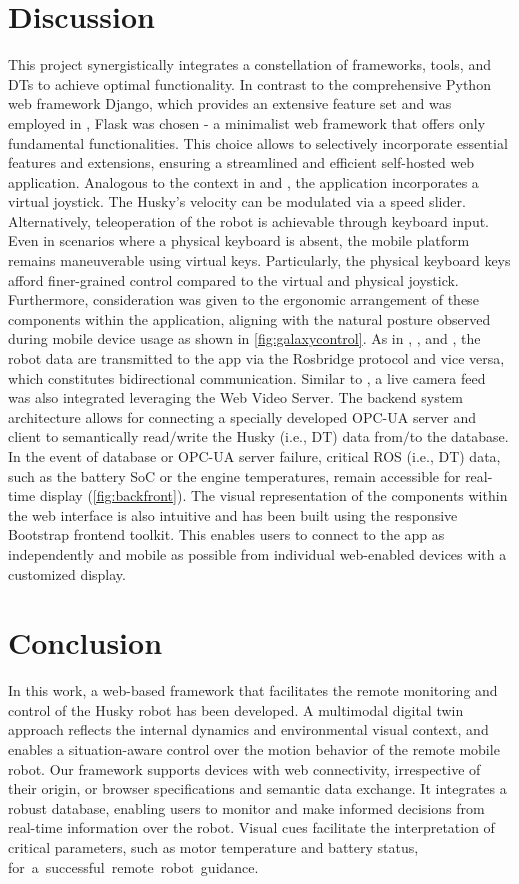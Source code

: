 \documentclass[conference]{IEEEtran}
\begin{document}
\section{Discussion}
This project synergistically integrates a constellation of frameworks, tools, and DTs to achieve optimal functionality. In contrast to the comprehensive Python web framework Django, which provides an extensive feature set \cite{django} and was employed in \cite{kapic}, Flask was chosen - a minimalist web framework that offers only fundamental functionalities. 
This choice allows to selectively incorporate essential features and extensions, ensuring a streamlined and efficient self-hosted web application. 
Analogous to the context in \cite{kapic} and \cite{dinodi}, the application incorporates a virtual joystick.
The Husky's velocity can be modulated via a speed slider. Alternatively, teleoperation of the robot is achievable through keyboard input. Even in scenarios where a physical keyboard is absent, the mobile platform remains maneuverable using virtual keys. Particularly, the physical keyboard keys afford finer-grained control compared to the virtual and physical joystick. 
Furthermore, consideration was given to the ergonomic arrangement of these components within the application, aligning with the natural posture observed during mobile device usage as shown in  \cref{fig:galaxycontrol}.
As in \cite{kapic}, \cite{dinodi}, \cite{johnson} and \cite{wang}, the robot data are transmitted to the app via the Rosbridge protocol and vice versa, which constitutes bidirectional communication. Similar to \cite{johnson}, a live camera feed was also integrated leveraging the Web Video Server.
The backend system architecture allows for connecting a specially developed OPC-UA server and client to semantically read$\slash$write the Husky (i.e., DT) data from$\slash$to the database. In the event of database or OPC-UA server failure, critical ROS (i.e., DT) data, such as the battery SoC or the engine temperatures, remain accessible for real-time display (\cref{fig:backfront}).
The visual representation of the components within the web interface is also intuitive and has been built using the responsive Bootstrap frontend toolkit. This enables users to connect to the app as independently and mobile as possible from individual web-enabled devices with a customized display.

\section{Conclusion}
In this work, a web-based framework that facilitates the remote monitoring and control of the Husky robot has been developed. A multimodal digital twin approach reflects the internal dynamics and environmental visual context, and enables a situation-aware control over the motion behavior of the remote mobile robot. 
Our framework supports devices with web connectivity, irrespective of their origin, or browser specifications and semantic data exchange. It integrates a robust database, enabling users to monitor and make  informed decisions from  real-time information over the robot. 
Visual cues facilitate the interpretation of critical parameters, such as motor temperature and battery status, \mbox{for a successful  remote robot guidance.}
\end{document}
